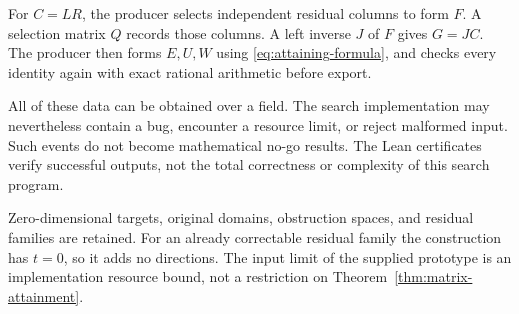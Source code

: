 \documentclass[11pt,letterpaper,oneside,openany]{book}
\theoremstyle{quiet}
\begin{document}
For $C=LR$, the producer selects independent residual columns to form $F$. A selection matrix $Q$ records those columns. A left inverse $J$ of $F$ gives $G=JC$. The producer then forms $E,U,W$ using \eqref{eq:attaining-formula}, and checks every identity again with exact rational arithmetic before export.

All of these data can be obtained over a field. The search implementation may nevertheless contain a bug, encounter a resource limit, or reject malformed input. Such events do not become mathematical no-go results. The Lean certificates verify successful outputs, not the total correctness or complexity of this search program.

Zero-dimensional targets, original domains, obstruction spaces, and residual families are retained. For an already correctable residual family the construction has $t=0$, so it adds no directions. The input limit of the supplied prototype is an implementation resource bound, not a restriction on Theorem~\ref{thm:matrix-attainment}.
\end{document}
